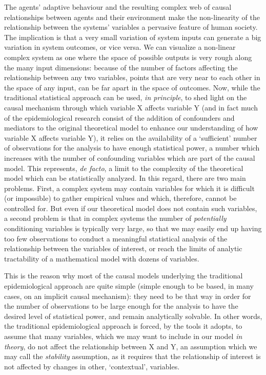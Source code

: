 \documentclass[review]{elsarticle}
\begin{document}
The agents' adaptive behaviour and the resulting complex web of causal relationships between agents and their environment make the non-linearity of the relationship between the systems' variables a pervasive feature of human society. The implication is that a very small variation of system inputs can generate a big variation in system outcomes, or vice versa. We can visualize a non-linear complex system as one where the space of possible outputs is very rough along the many input dimensions: because of the number of factors affecting the relationship between any two variables, points that are very near to each other in the space of any input, can be far apart in the space of outcomes. Now, while the traditional statistical approach can be used, \textit{in principle}, to shed light on the causal mechanism through which variable X affects variable Y (and in fact much of the epidemiological research consist of the addition of confounders and mediators to the original theoretical model to enhance our understanding of how variable X affects variable Y), it relies on the availability of a `sufficient' number of observations for the analysis to have enough statistical power, a number which increases with the number of confounding variables which are part of the causal model.
This represents, \textit{de facto}, a limit to the complexity of the theoretical model which can be statistically analyzed. In this regard, there are two main problems. First, a complex system may contain variables for which it is difficult (or impossible) to gather empirical values and which, therefore, cannot be controlled for. But even if our theoretical model does not contain such variables, a second problem is that in complex systems the number of \textit{potentially} conditioning variables is typically very large, so that we may easily  end up having too few observations to conduct a meaningful statistical analysis of the relationship between the variables of interest, or reach the limits of analytic tractability of a mathematical model with dozens of variables.

This is the reason why most of the causal models underlying the traditional epidemiological approach are quite simple (simple enough to be based, in many cases, on an implicit causal mechanism): they need to be that way in order for the number of observations to be large enough for the analysis to have the desired level of statistical power, and remain analytically solvable. In other words, the traditional epidemiological approach is forced, by the tools it adopts, to assume that many variables, which we may want to include in our model \textit{in theory}, do not affect the relationship between X and Y, an assumption which we may call the \textit{stability} assumption, as it requires that the relationship of interest is not affected by changes in other, `contextual', variables.
\end{document}
